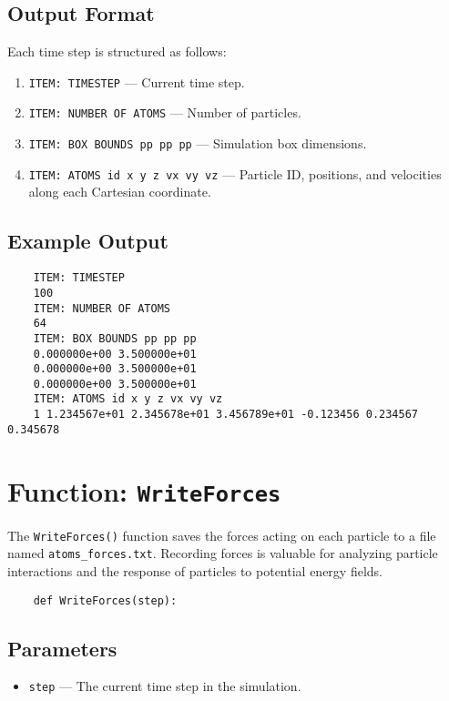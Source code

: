 \documentclass[12pt, ngerman]{report}
\begin{document}
\subsection*{Output Format}
Each time step is structured as follows:
\begin{enumerate}
	\item \texttt{ITEM: TIMESTEP} --- Current time step.
	\item \texttt{ITEM: NUMBER OF ATOMS} --- Number of particles.
	\item \texttt{ITEM: BOX BOUNDS pp pp pp} --- Simulation box dimensions.
	\item \texttt{ITEM: ATOMS id x y z vx vy vz} --- Particle ID, positions, and velocities along each Cartesian coordinate.
\end{enumerate}

\subsection*{Example Output}
\begin{verbatim}
	ITEM: TIMESTEP 
	100 
	ITEM: NUMBER OF ATOMS 
	64 
	ITEM: BOX BOUNDS pp pp pp 
	0.000000e+00 3.500000e+01 
	0.000000e+00 3.500000e+01 
	0.000000e+00 3.500000e+01 
	ITEM: ATOMS id x y z vx vy vz 
	1 1.234567e+01 2.345678e+01 3.456789e+01 -0.123456 0.234567 0.345678 
\end{verbatim}

\section{Function: \texttt{WriteForces}}
\label{sec:writeforces}

The \texttt{WriteForces()} function saves the forces acting on each particle to a file named \texttt{atoms\_forces.txt}. Recording forces is valuable for analyzing particle interactions and the response of particles to potential energy fields.

\begin{verbatim}
	def WriteForces(step):
\end{verbatim}

\subsection*{Parameters}
\begin{itemize}
	\item \texttt{step} --- The current time step in the simulation.
\end{itemize}
\end{document}
